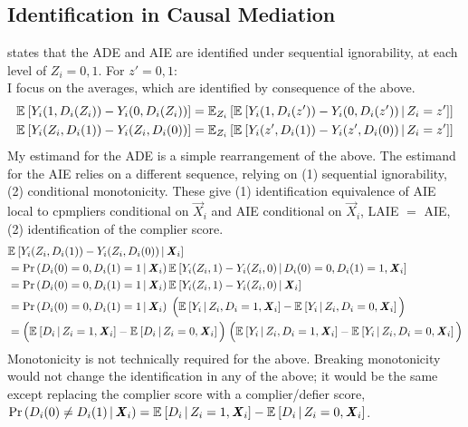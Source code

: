 \subsection{Identification in Causal Mediation}
\label{appendix:identification}
\citet[Theorem~1]{imai2010identification} states that the ADE and AIE are identified under sequential ignorability, at each level of $Z_i = 0,1$.
For $z' = 0,1$: \\
I focus on the averages, which are identified by consequence of the above.
\begin{align*}
    \E{ Y_i(1, D_i(Z_i)) - Y_i(0, D_i(Z_i))}
    &= \E[Z_i]{\Egiven{ Y_i(1, D_i(z')) - Y_i(0, D_i(z'))}{Z_i = z'}} \\
    \E{ Y_i(Z_i, D_i(1)) - Y_i(Z_i, D_i(0))}
    & = \E[Z_i]{\Egiven{ Y_i(z', D_i(1)) - Y_i(z', D_i(0))}{Z_i = z'}}
\end{align*}
My estimand for the ADE is a simple rearrangement of the above.
The estimand for the AIE relies on a different sequence, relying on (1) sequential ignorability, (2) conditional monotonicity.
These give (1) identification equivalence of AIE local to cpmpliers conditional on $\vec X_i$ and AIE conditional on $\vec X_i$, LAIE $=$ AIE, (2) identification of the complier score.
\begin{align*}
    & \Egiven{ Y_i(Z_i, D_i(1)) - Y_i(Z_i, D_i(0))}{\vec X_i} \\
    & = \Probgiven{D_i(0) = 0, D_i(1) = 1}{\vec X_i}
        \Egiven{ Y_i(Z_i, 1) - Y_i(Z_i, 0)}{D_i(0) = 0, D_i(1) = 1, \vec X_i} \\
    & = \Probgiven{D_i(0) = 0, D_i(1) = 1}{\vec X_i}
        \Egiven{ Y_i(Z_i, 1) - Y_i(Z_i, 0)}{\vec X_i} \\
    & = \Probgiven{D_i(0) = 0, D_i(1) = 1}{\vec X_i}
        \; \Big( \Egiven{Y_i}{Z_i, D_i = 1, \vec X_i}
            - \Egiven{Y_i}{Z_i, D_i = 0, \vec X_i} \Big) \\
    & = \Big( \Egiven{D_i}{Z_i = 1, \vec X_i} - \Egiven{D_i}{Z_i = 0, \vec X_i}
        \Big) \;
        \Big( \Egiven{Y_i}{Z_i, D_i = 1, \vec X_i}
            - \Egiven{Y_i}{Z_i, D_i = 0, \vec X_i} \Big)
\end{align*}
Monotonicity is not technically required for the above.
Breaking monotonicity would not change the identification in any of the above; it would be the same except replacing the complier score with a complier/defier score, $\Probgiven{D_i(0) \neq D_i(1)}{\vec X_i} = \Egiven{D_i}{Z_i = 1, \vec X_i} - \Egiven{D_i}{Z_i = 0, \vec X_i}$.

